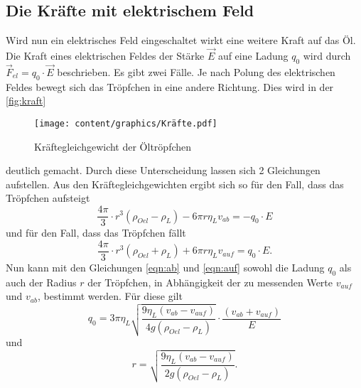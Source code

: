 \subsection{Die Kräfte mit elektrischem Feld}
\label{ssec:th_mit}
Wird nun ein elektrisches Feld eingeschaltet wirkt eine weitere Kraft auf das Öl.
Die Kraft eines elektrischen Feldes der Stärke $\overrightarrow{E}$ auf eine Ladung $q_0$ wird durch $\overrightarrow{F}_{el}=q_0\cdot \overrightarrow{E}$ beschrieben.
Es gibt zwei Fälle. Je nach Polung des elektrischen Feldes bewegt sich das Tröpfchen in eine andere Richtung.
Dies wird in der \autoref{fig:kraft}
\begin{figure}
    \centering
    \texttt{[image: content/graphics/Kräfte.pdf]}
    \caption{Kräftegleichgewicht der Öltröpfchen \cite{v503}}
    \label{fig:kraft}
\end{figure}
deutlich gemacht.
Durch diese Unterscheidung lassen sich 2 Gleichungen aufstellen. Aus den Kräftegleichgewichten ergibt sich so für den Fall, dass das Tröpfchen aufsteigt
\begin{equation}
    \label{eqn:ab}
    \frac{4\pi}{3}\cdot r^3\left(\rho_{Oel}-\rho_{L}\right)-6\pi r \eta_L v_{ab}=-q_0\cdot E
\end{equation}
und für den Fall, dass das Tröpfchen fällt
\begin{equation}
    \label{eqn:auf}
    \frac{4\pi}{3}\cdot r^3\left(\rho_{Oel}+\rho_{L}\right)+6\pi r \eta_L v_{auf}=q_0\cdot E.
\end{equation}
Nun kann mit den Gleichungen \eqref{eqn:ab} und \eqref{eqn:auf} sowohl die Ladung $q_0$ als auch der Radius $r$ der Tröpfchen,
in Abhängigkeit der zu messenden Werte $v_{auf}$ und $v_{ab}$, bestimmt werden.
Für diese gilt
\begin{equation}
    \label{eqn:Ladung0}
    q_0=3\pi \eta_L\sqrt{\frac{9 \eta_L \left(v_{ab}-v_{auf}\right) }{4 g \left(\rho_{Oel}-\rho_{L}\right)}}\cdot \frac{\left(v_{ab}+v_{auf}\right)}{E}
\end{equation}
und
\begin{equation}
    \label{eqn:Radius}
    r = \sqrt{\frac{9 \eta_L \left(v_{ab}-v_{auf}\right)}{2 g \left(\rho_{Oel}-\rho_{L}\right)}}.
\end{equation}
